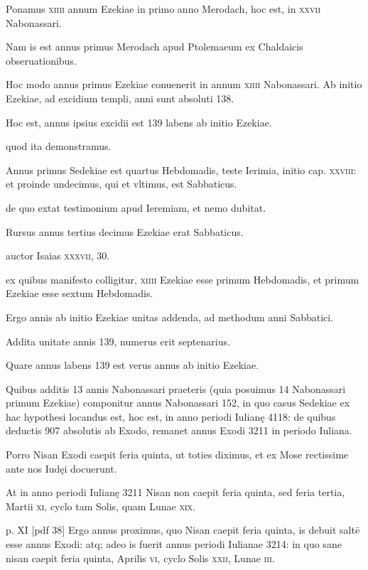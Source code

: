 \begin{parnumbers}
Ponamus \textsc{xiiii} annum Ezekiae in
primo anno Merodach, hoc est, in \textsc{xxvii} Nabonassari.

Nam is est
annus primus Merodach apud Ptolemaeum ex Chaldaicis obseruationibus. 

Hoc modo annus primus Ezekiae conuenerit in annum
\textsc{xiiii} Nabonassari. Ab initio Ezekiae, ad excidium templi, anni
sunt absoluti 138.

Hoc est, annus ipsius excidii est 139 labens ab initio
Ezekiae.

quod ita demonstramus. 

Annus primus Sedekiae est
quartus Hebdomadis, teste Ierimia, initio cap. \textsc{xxviii}: et proinde
undecimus, qui et vltimus, est Sabbaticus. 

de quo extat testimonium
apud Ieremiam, et nemo dubitat.

Rursus annus tertius decimus
Ezekiae erat Sabbaticus. 

auctor Isaias \textsc{xxxvii}, 30.

ex quibus
manifesto colligitur, \textsc{xiiii} Ezekiae esse primum Hebdomadis, et primum
Ezekiae esse sextum Hebdomadis. 

Ergo annis ab initio Ezekiae unitas addenda, ad methodum anni Sabbatici.

Addita unitate annis
139, numerus erit septenarius. 

Quare annus labens 139 est verus
annus ab initio Ezekiae.

Quibus additis 13 annis Nabonassari praeteris
(quia posuimus 14 Nabonassari primum Ezekiae) componitur
annus Nabonassari 152, in quo casus Sedekiae ex hac hypothesi
locandus est, hoc est, in anno periodi Iulianę 4118: de quibus deductis
907 absolutis ab Exodo, remanet annus Exodi 3211 in periodo Iuliana.

Porro Nisan Exodi caepit feria quinta, ut toties diximus, et ex
Mose rectissime ante nos Iudęi docuerunt.

At in anno periodi Iulianę
3211 Nisan non caepit feria quinta, sed feria tertia, Martii \textsc{xi}, cyclo tam
Solis, quam Lunae \textsc{xix}.

\clearpage
p. XI [pdf 38]
Ergo annus proximus, quo Nisan caepit feria
quinta, is debuit saltē esse annus Exodi: atq; adeo is fuerit annus periodi
Iulianae 3214: in quo sane nisan caepit feria quinta, Aprilis \textsc{vi},
cyclo Solis \textsc{xxii}, Lunae \textsc{iii}.


\end{parnumbers}
